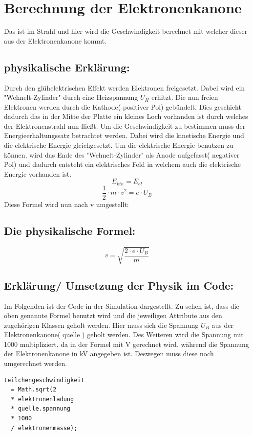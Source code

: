 \section{Berechnung der Elektronenkanone}
Das ist im Strahl und hier wird die Geschwindigkeit berechnet mit welcher dieser aus der Elektronenkanone kommt. 

\subsection{physikalische Erklärung:}

Durch den glühelektrischen Effekt werden Elektronen freigesetzt. Dabei wird ein "Wehnelt-Zylinder" durch eine Heizspannung $U_H$ erhitzt. Die nun freien Elektronen werden durch die Kathode( positiver Pol) gebündelt. Dies geschieht dadurch das in der Mitte der Platte ein kleines Loch vorhanden ist durch welches der Elektronenstrahl nun fließt. Um die Geschwindigkeit zu bestimmen muss der Energieerhaltungssatz betrachtet werden. Dabei wird die kinetische Energie und die elektrische Energie gleichgesetzt. Um die elektrische Energie benutzen zu können, wird das Ende des "Wehnelt-Zylinder" als Anode aufgefasst( negativer Pol) und dadurch entsteht ein elektrisches Feld in welchem auch die elektrische Energie vorhanden ist. 
$$ E_{kin} = E_{el}$$
$$ \frac{1}{2} \cdot m \cdot v^2 = e \cdot U_B$$
Diese Formel wird  nun nach v umgestellt:
\subsection{Die physikalische Formel:} 
$$ v = \sqrt{\frac{2 \cdot e \cdot U_B}{m}}$$

\subsection{Erklärung/ Umsetzung der Physik im Code:}

Im Folgenden ist der Code in der Simulation dargestellt. Zu sehen ist, dass die oben genannte Formel benutzt wird und die jeweiligen Attribute aus den zugehörigen Klassen geholt werden. Hier muss sich die Spannung $U_B$ aus der Elektronenkanone( quelle ) geholt werden. Des Weiteren wird die Spannung mit 1000 multipliziert, da in der Formel mit V gerechnet wird, während die Spannung der Elektronenkanone in kV angegeben ist. Deswegen muss diese noch umgerechnet werden.
\begin{lstlisting}
teilchengeschwindigkeit 
  = Math.sqrt(2 
  * elektronenladung 
  * quelle.spannung 
  * 1000 
  / elektronenmasse);
\end{lstlisting}


